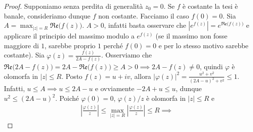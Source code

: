 \begin{proof}
  Supponiamo senza perdita di generalità $z_0=0$. Se $f$ è costante la tesi è banale, consideriamo dunque $f$ non costante. Facciamo il caso $f(0)=0$. Sia $\displaystyle A=\max_{|z|=R}\mathfrak{Re}\big(f(z)\big)$. $A>0$, infatti basta osservare che $|e^{f(z)}|=e^{\mathfrak{Re}\big(f(z)\big)}$ e applicare il principio del massimo modulo a $e^{f(z)}$ (se il massimo non fosse maggiore di $1$, sarebbe proprio $1$ perché $f(0)=0$ e per lo stesso motivo sarebbe costante). Sia $\varphi(z)=\frac{f(z)}{2A-f(z)}$.
  Osserviamo che $\mathfrak{Re}\big(2A-f(z)\big)=2A-\mathfrak{Re}\big(f(z)\big) \ge A>0 \implies 2A-f(z)\not=0$, quindi $\varphi$ è olomorfa in $|z| \le R$.
  Posto $f(z)=u+iv$, allora $|\varphi(z)|^2=\frac{u^2+v^2}{(2A-u)^2+v^2} \le 1$. Infatti, $u \le A \implies u \le 2A-u$ e ovviamente $-2A+u \le u$, dunque $u^2 \le (2A-u)^2$.
  Poiché $\varphi(0)=0$, $\varphi(z)/z$ è olomorfa in $|z| \le R$ e
  \begin{gather*}
    \left|\frac{\varphi(z)}{z}\right| \le \max_{|z|=R} \left|\frac{\varphi(z)}{z}\right| \le R \implies
  \end{gather*}
\end{proof}
